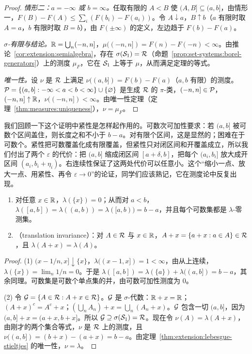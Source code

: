 \begin{proof}
\emph{情形二：$a=-\infty$ 或 $b=\infty$。}任取有限的 $A<B$ 使 $(A,B]\subseteq(a,b]$，由情形一，$F(B)-F(A)\leqslant\sum_i(F(b_i)-F(a_i))$。令 $A\downarrow a$，$B\uparrow b$（$a$ 有限时取 $A=a$，$b$ 有限时取 $B=b$），由 $F(\pm\infty)$ 的定义，左边趋于 $F(b)-F(a)$。

\emph{$\sigma$-有限与结论。}$\mathbb{R}=\bigcup_n(-n,n]$，$\mu((-n,n])=F(n)-F(-n)<\infty$。由推论~\ref{cor:extension:semialgebra}，存在 $\sigma(\mathcal{S}_1)=\mathcal{R}$（命题~\ref{prop:set-systems:borel-generators}）上的测度 $\mu_F$，它在 $\mathcal{S}_1$ 上等于 $\mu$，从而满足定理的等式。

\emph{唯一性。}设 $\nu$ 是 $\mathcal{R}$ 上满足 $\nu((a,b])=F(b)-F(a)$（$a,b$ 有限）的测度。$\mathcal{P}=\{(a,b]:-\infty<a<b<\infty\}\cup\{\varnothing\}$ 是生成 $\mathcal{R}$ 的 $\pi$-类，$(-n,n]\in\mathcal{P}$，$(-n,n]\uparrow\mathbb{R}$，$\nu((-n,n])<\infty$。由唯一性定理（定理~\ref{thm:measures:uniqueness}），$\nu=\mu_F$。
\end{proof}

\begin{remark}
我们回顾一下这个证明中紧性是怎样起作用的。可数次可加性要求：若 $(a,b]$ 被可数个区间盖住，则长度之和不小于 $b-a$。对有限个区间，这是显然的；困难在于可数个。紧性把可数覆盖化成有限覆盖，但紧性只对闭区间和开覆盖成立，所以我们付出了两个 $\varepsilon$ 的代价：把 $(a,b]$ 缩成闭区间 $[a+\delta,b]$，把每个 $(a_i,b_i]$ 放大成开区间 $(a_i,b_i+\eta_i)$。右连续性保证了这两处代价可以任意小。这个“缩小一点、放大一点、用紧性、再令 $\varepsilon\to0$”的论证，同学们应该熟记，它在测度论中反复出现。
\end{remark}

\begin{proposition}\label{prop:extension:lebesgue}
\begin{enumerate}
\item 对任意 $x\in\mathbb{R}$，$\lambda(\{x\})=0$；从而对 $a<b$，$\lambda([a,b])=\lambda((a,b))=\lambda([a,b))=b-a$，并且每个可数集都是 $\lambda$-零测集。
\item {}（translation invariance）：对 $A\in\mathcal{R}$ 与 $x\in\mathbb{R}$，$A+x=\{a+x:a\in A\}\in\mathcal{R}$，且 $\lambda(A+x)=\lambda(A)$。
\end{enumerate}
\end{proposition}
\begin{proof}
(1) $(x-1/n,x]\downarrow\{x\}$，$\lambda((x-1,x])=1<\infty$，由从上连续，$\lambda(\{x\})=\lim_n1/n=0$。于是 $\lambda([a,b])=\lambda(\{a\})+\lambda((a,b])=b-a$，其余同理。可数集是可数个单点集的并，由可数可加性测度为 $0$。

(2) 令 $\mathcal{G}=\{A\in\mathcal{R}: A+x\in\mathcal{R}\}$。$\mathcal{G}$ 是 $\sigma$-代数：$\mathbb{R}+x=\mathbb{R}$；$(A+x)^c=A^c+x$；$(\bigcup_nA_n)+x=\bigcup_n(A_n+x)$。$\mathcal{G}$ 包含一切 $(a,b]$，因为 $(a,b]+x=(a+x,b+x]$。所以 $\mathcal{G}\supseteq\sigma(\mathcal{S}_1)=\mathcal{R}$。现在令 $\nu(A)=\lambda(A+x)$，由刚才的两个集合等式，$\nu$ 是 $\mathcal{R}$ 上的测度，且 $\nu((a,b])=(b+x)-(a+x)=b-a$。由定理~\ref{thm:extension:lebesgue-stieltjes} 的唯一性，$\nu=\lambda$。
\end{proof}

